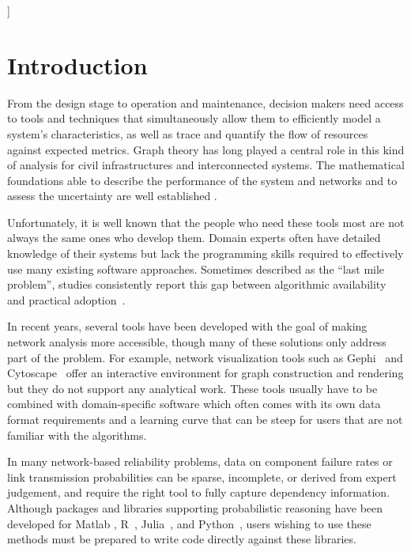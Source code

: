 \documentclass[twocolumn]{rps-esrel2026}
\begin{document}

]

\section{Introduction}

From the design stage to operation and maintenance, decision makers need access to tools and techniques that simultaneously allow them to efficiently model a system's characteristics, as well as trace and quantify the flow of resources against expected metrics. Graph theory has long played a central role in this kind of analysis for civil infrastructures and interconnected systems. The mathematical foundations able to describe the performance of the system and networks and to assess the uncertainty are well established \cite{pearl1988probabilistic, koller2009probabilistic, ferson2013}.  

Unfortunately, it is well known that the people who need these tools most are not always the same ones who develop them. Domain experts often have detailed knowledge of their systems but lack the programming skills required to effectively use many existing software approaches. Sometimes described as the ``last mile problem'', studies consistently report this gap between algorithmic availability and practical adoption~\cite{hannay2009scientists, prabhu2011survey}.

In recent years, several tools have been developed with the goal of making network analysis more accessible, though many of these solutions only address part of the problem. For example, network visualization tools such as Gephi~\cite{bastian2009gephi} and Cytoscape~\cite{shannon2003cytoscape} offer an interactive environment for graph construction and rendering but they do not support any analytical work. These tools usually have to be combined with domain-specific software which often comes with its own data format requirements and a learning curve that can be steep for users that are not familiar with the algorithms.

In many network-based reliability problems, data on component failure rates or link transmission probabilities can be sparse, incomplete, or derived from expert judgement, and require the right tool to fully capture dependency information. Although packages and libraries supporting probabilistic reasoning have been developed for Matlab \cite{OpenCossan}, R~\cite{ferson2019pbar}, Julia~\cite{gray2022pba_julia}, and Python~\cite{gray2022pba}, users wishing to use these methods must be prepared to write code directly against these libraries.
\end{document}
